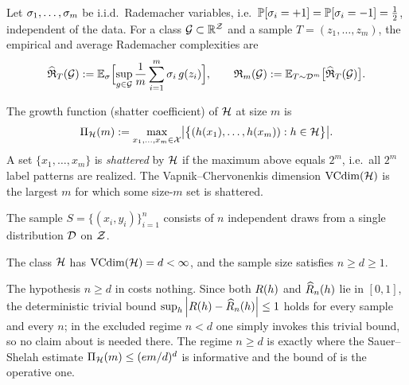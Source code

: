 \begin{definition}\label{def:rademacher}
Let $\sigma_1,\dots,\sigma_m$ be i.i.d.\ Rademacher variables, i.e.\
$\mathbb{P}[\sigma_i=+1]=\mathbb{P}[\sigma_i=-1]=\tfrac12$, independent of the data. For a class
$\mathcal{G}\subset\mathbb{R}^{\mathcal{Z}}$ and a sample $T=(z_1,\dots,z_m)$, the empirical and
average Rademacher complexities are
\begin{align}\label{eq:rad-def}
\widehat{\mathfrak{R}}_T(\mathcal{G}):=\mathbb{E}_{\sigma}\Bigl[\sup_{g\in\mathcal{G}}\frac1m\sum_{i=1}^{m}
   \sigma_i\,g(z_i)\Bigr],
\qquad
\mathfrak{R}_m(\mathcal{G}):=\mathbb{E}_{T\sim\mathcal{D}^{m}}\bigl[\widehat{\mathfrak{R}}_T(\mathcal{G})\bigr].
\end{align}
\end{definition}

\begin{definition}\label{def:growth}
The growth function (shatter coefficient) of $\mathcal{H}$ at size $m$ is
\begin{align}\label{eq:growth-def}
\Pi_{\mathcal{H}}(m):=\max_{x_1,\dots,x_m\in\mathcal{X}}
   \bigl|\bigl\{(h(x_1),\dots,h(x_m)):h\in\mathcal{H}\bigr\}\bigr|.
\end{align}
A set $\{x_1,\dots,x_m\}$ is \emph{shattered} by $\mathcal{H}$ if the maximum above
equals $2^{m}$, i.e.\ all $2^{m}$ label patterns are realized. The
Vapnik--Chervonenkis dimension $\operatorname{VCdim}(\mathcal{H})$ is the largest $m$ for which some
size-$m$ set is shattered.
\end{definition}

\begin{assumption}[I.i.d.\ sampling]\label{ass:iid}
The sample $S=\{(x_i,y_i)\}_{i=1}^{n}$ consists of $n$ independent draws from a
single distribution $\mathcal{D}$ on $\mathcal{Z}$.
\end{assumption}

\begin{assumption}\label{ass:vc}
The class $\mathcal{H}$ has $\operatorname{VCdim}(\mathcal{H})=d<\infty$, and the sample size satisfies
$n\ge d\ge 1$.
\end{assumption}

\begin{remark}\label{rem:regime}
The hypothesis $n\ge d$ in  costs nothing. Since both $R(h)$ and
$\widehat{R}_n(h)$ lie in $[0,1]$, the deterministic trivial bound
$\sup_{h}\left| R(h)-\widehat{R}_n(h) \right|\le 1$ holds for every sample and every $n$;
in the excluded regime $n<d$ one simply invokes this trivial bound, so no claim
about \Cref{thm:vc-bound} is needed there. The regime $n\ge d$ is exactly where
the Sauer--Shelah estimate $\Pi_{\mathcal{H}}(m)\le(em/d)^{d}$ is informative and
the bound of \Cref{thm:vc-bound} is the operative one.
\end{remark}

